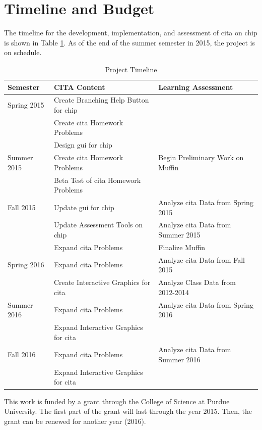 \section{Timeline and Budget}

The timeline for the development, implementation, and assessment of \gls{cita} on \gls{chip} is shown in Table \ref{tab:timeline}. As of the end of the summer semester in 2015, the project is on schedule.

\pagebreak

\begin{landscape}
\begin{table}[!ht]
  \centering
  \begin{tabular}{|l|l|l|}
    \hline
    \textbf{Semester} & \textbf{CITA Content} & \textbf{Learning Assessment}\\
	\hline
	Spring 2015 & Create Branching Help Button for \gls{chip} & \\
	& Create \gls{cita} Homework Problems & \\
	& Design \gls{gui} for \gls{chip} & \\
	\hline
	Summer 2015 & Create \gls{cita} Homework Problems & Begin Preliminary Work on Muffin\\
	& Beta Test of \gls{cita} Homework Problems &  \\
	\hline
	Fall 2015 & Update \gls{gui} for \gls{chip} & Analyze \gls{cita} Data from Spring 2015 \\
	& Update Assessment Tools on \gls{chip} & Analyze \gls{cita} Data from Summer 2015 \\
	& Expand \gls{cita} Problems & Finalize Muffin \\
	\hline
	Spring 2016 & Expand \gls{cita} Problems & Analyze \gls{cita} Data from Fall 2015 \\
	& Create Interactive Graphics for \gls{cita} & Analyze Class Data from 2012-2014 \\
	\hline
	Summer 2016 & Expand \gls{cita} Problems & Analyze \gls{cita} Data from Spring 2016 \\
	& Expand Interactive Graphics for \gls{cita} & \\
	\hline
	Fall 2016 & Expand \gls{cita} Problems & Analyze \gls{cita} Data from Summer 2016 \\
	& Expand Interactive Graphics for \gls{cita} & \\
	\hline
  \end{tabular}
  \caption{Project Timeline}
  \label{tab:timeline}
\end{table}
\end{landscape}

\pagebreak

This work is funded by a grant through the College of Science at Purdue University. The first part of the grant will last through the year 2015. Then, the grant can be renewed for another year (2016).